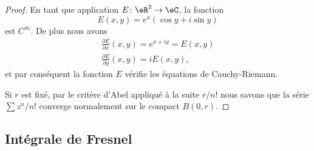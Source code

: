 \begin{proof}
	En tant que application \( E\colon \eR^2\to \eC\), la fonction
	\begin{equation}
		E(x,y)=e^x(\cos y+i\sin y)
	\end{equation}
	est \( C^{\infty}\). De plus nous avons
	\begin{subequations}
		\begin{align}
			\frac{ \partial E }{ \partial x }(x,y)= e^{x+iy}=E(x,y) \\
			\frac{ \partial E }{ \partial y }(x,y)=iE(x,y),
		\end{align}
	\end{subequations}
	et par conséquent la fonction \( E\) vérifie les équations de Cauchy-Riemann.

	Si \( r\) est fixé, par le critère d'Abel appliqué à la suite \(r/n!\) nous savons que la série \( \sum z^n/n!\) converge normalement sur le compact \( B(0,r)\).
\end{proof}

\subsection{Intégrale de Fresnel}

